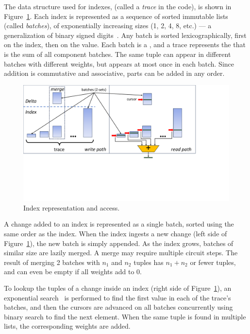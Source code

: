 The data structure used for indexes, (called a \emph{trace} in the
code), is shown in Figure~\ref{fig:trace}.  Each index is represented
as a sequence of sorted immutable lists (called \emph{batches}), of
exponentially increasing sizes (1, 2, 4, 8, etc.) --- a generalization
of binary signed digits~\cite{signed-digits}.  Any batch is sorted
lexicographically, first on the index, then on the value.  Each batch
is a \zr, and a trace represents the \zr that is the sum of all
component batches.  The same tuple can appear in different batches
with different weights, but appears at most once in each batch.  Since
addition is commutative and associative, parts can be added in any
order.

\begin{figure}[h]
  \begin{center}
    \includegraphics[trim={0 2.9in 2.1in 0},clip,scale=.27]{trace.pdf}
    \caption{\label{fig:trace}Index representation and access.}
  \end{center}
\end{figure}

A change added to an index is represented as a single batch, sorted
using the same order as the index.  When the index ingests a new
change (left side of Figure~\ref{fig:trace}), the new batch is simply
appended.  As the index grows, batches of similar size are lazily
merged.  A merge may require multiple circuit steps.  The result of
merging 2 batches with \(n_1\) and \(n_2\) tuples has \(n_1 +
n_2\) or fewer tuples, and can even be empty if all weights add to 0.

To lookup the tuples of a change inside an index (right side of
Figure~\ref{fig:trace}), an exponential search~\cite{bentley-ipl76} is
performed to find the first value in each of the trace's batches, and
then the cursors are advanced on all batches concurrently using binary
search to find the next element.  When the same tuple is found in
multiple lists, the corresponding weights are added.


